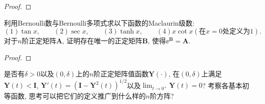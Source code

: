 \begin{quizb}
\begin{proof}
\end{proof}
\woe 利用Bernoulli数与Bernoulli多项式求以下函数的Maclaurin级数:
\[(1)\tan x,\qquad (2)\sec x,\qquad (3)\tanh x,\qquad (4)x\cot x(\text{在}x=0\text{处定义为}1).\qquad\qquad\qquad\qquad\]
\woe 对于\(n\)阶正定矩阵\(\boldsymbol{A}\), 证明存在唯一的正定矩阵\(\boldsymbol{B}\), 使得\(\ee^{\boldsymbol{B}}=\boldsymbol{A}\).
\begin{proof}

\end{proof}
\woe 是否有\(\delta>0\)以及\((0,\delta)\)上的\(n\)阶正定矩阵值函数\(\boldsymbol{Y}(\cdot)\), 在\((0,\delta)\)上满足\(\boldsymbol{Y}(t)<\boldsymbol{I}\), \(\boldsymbol{Y}'(t)=(\boldsymbol{I}-\boldsymbol{Y}^2(t))^{1/2}\)以及\(\lim_{t\rightarrow 0^+}\boldsymbol{Y}(t)=0\)?
\woe 考察各基本初等函数, 思考可以把它们的定义推广到什么样的\(n\)阶方阵?
\end{quizb}
